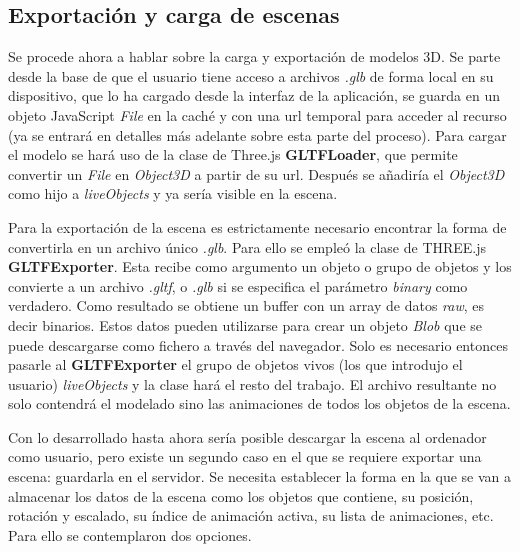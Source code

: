 \subsection{Exportación y carga de escenas}

Se procede ahora a hablar sobre la carga y exportación de modelos 3D. Se parte desde la base de que el usuario tiene acceso a archivos \textit{.glb} de forma local en su dispositivo, que lo ha cargado desde la interfaz de la aplicación, se guarda en un objeto JavaScript \textit{File} en la caché y con una url temporal para acceder al recurso (ya se entrará en detalles más adelante sobre esta parte del proceso). Para cargar el modelo se hará uso de la clase de Three.js \textbf{GLTFLoader}, que permite convertir un \textit{File} en \textit{Object3D} a partir de su url. Después se añadiría el \textit{Object3D} como hijo a \textit{liveObjects} y ya sería visible en la escena.

Para la exportación de la escena es estrictamente necesario encontrar la forma de convertirla en un archivo único \textit{.glb}. Para ello se empleó la clase de THREE.js \textbf{GLTFExporter}. Esta recibe como argumento un objeto o grupo de objetos y los convierte a un archivo \textit{.gltf}, o \textit{.glb} si se especifica el parámetro \textit{binary} como verdadero. Como resultado se obtiene un buffer con un array de datos \textit{raw}, es decir binarios. Estos datos pueden utilizarse para crear un objeto \textit{Blob} que se puede descargarse como fichero a través del navegador. Solo es necesario entonces pasarle al \textbf{GLTFExporter} el grupo de objetos vivos (los que introdujo el usuario) \textit{liveObjects} y la clase hará el resto del trabajo. El archivo resultante no solo contendrá el modelado sino las animaciones de todos los objetos de la escena.

Con lo desarrollado hasta ahora sería posible descargar la escena al ordenador como usuario, pero existe un segundo caso en el que se requiere exportar una escena: guardarla en el servidor. Se necesita establecer la forma en la que se van a almacenar los datos de la escena como los objetos que contiene, su posición, rotación y escalado, su índice de animación activa, su lista de animaciones, etc. Para ello se contemplaron dos opciones.

